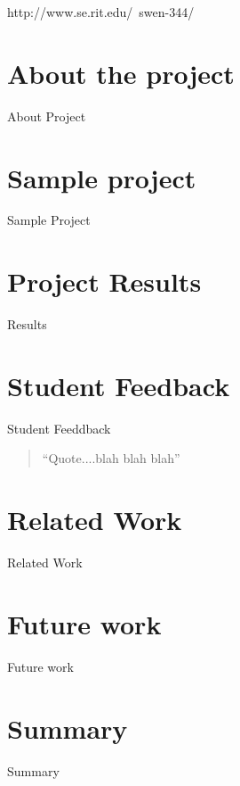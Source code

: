 \documentclass{sig-alternate}
\begin{document}
http://www.se.rit.edu/~swen-344/


\section{About the project}
\label{sec: aboutproject}

About Project


\section{Sample project}
\label{sec: sampleproject}

Sample Project


\section{Project Results}
\label{sec: projectresults}

Results

\section{Student Feedback}
\label{sec: studentfeedback}

Student Feeddback



\begin{quotation}
``Quote....blah blah blah''
\end{quotation}



\section{Related Work}
\label{sec: relatedwork}

Related Work





\section{Future work}
\label{sec: futurework}

Future work



\section{Summary}
\label{sec: summary}
Summary

\balance


\end{document}
